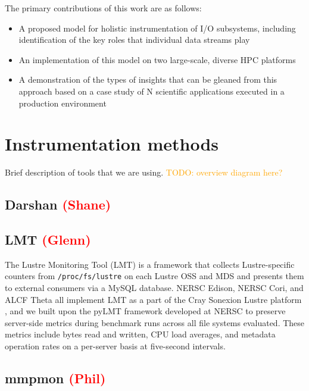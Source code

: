 \documentclass[conference,10pt,compsocconf]{IEEEtran}
\newcommand{\assign}[1]{\textcolor{red}{(#1)}}
\newcommand{\todo}[1]{\textcolor{Orange}{TODO: #1}}
\begin{document}

The primary contributions of this work are as follows:

\begin{itemize}
\item A proposed model for holistic instrumentation of I/O subsystems,
including identification of the key roles that individual data streams play
\item An implementation of this model on two large-scale, diverse HPC
platforms
\item A demonstration of the types of insights that can be gleaned from this
approach based on a case study of N scientific applications executed in a
production environment
\end{itemize}

\section{Instrumentation methods}

Brief description of tools that we are using.
\todo{overview diagram here?}

\subsection{Darshan \assign{Shane}}

\subsection{LMT \assign{Glenn}}

The Lustre Monitoring Tool (LMT) is a framework that collects Lustre-specific
counters from \texttt{/proc/fs/lustre} on each Lustre OSS and MDS and presents
them to external consumers via a MySQL database.  NERSC Edison, NERSC Cori, and
ALCF Theta all implement LMT as a part of the Cray Sonexion Lustre platform
\cite{Keopp2014}, and we built upon the pyLMT framework developed at NERSC
\cite{Uselton2009} to preserve server-side metrics during benchmark runs across
all file systems evaluated.  These metrics include bytes read and written, CPU
load averages, and metadata operation rates on a per-server basis at
five-second intervals.

\subsection{mmpmon \assign{Phil}}
\end{document}
